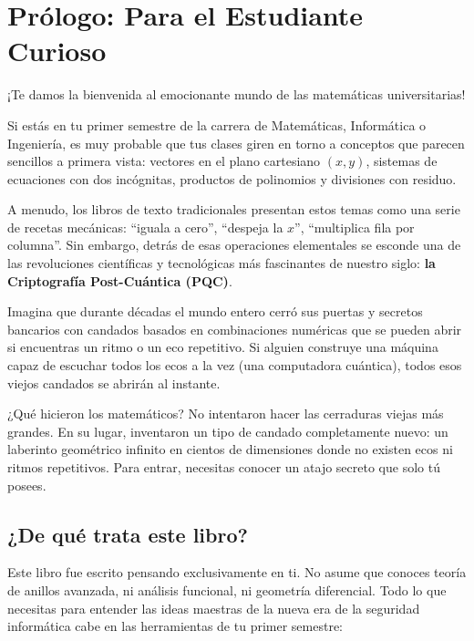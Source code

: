 \chapter*{Prólogo: Para el Estudiante Curioso}

¡Te damos la bienvenida al emocionante mundo de las matemáticas universitarias!

Si estás en tu primer semestre de la carrera de Matemáticas, Informática o Ingeniería, es muy probable que tus clases giren en torno a conceptos que parecen sencillos a primera vista: vectores en el plano cartesiano $(x, y)$, sistemas de ecuaciones con dos incógnitas, productos de polinomios y divisiones con residuo.

A menudo, los libros de texto tradicionales presentan estos temas como una serie de recetas mecánicas: ``iguala a cero'', ``despeja la $x$'', ``multiplica fila por columna''. Sin embargo, detrás de esas operaciones elementales se esconde una de las revoluciones científicas y tecnológicas más fascinantes de nuestro siglo: \textbf{la Criptografía Post-Cuántica (PQC)}.

\begin{metafora}
Imagina que durante décadas el mundo entero cerró sus puertas y secretos bancarios con candados basados en combinaciones numéricas que se pueden abrir si encuentras un ritmo o un eco repetitivo. Si alguien construye una máquina capaz de escuchar todos los ecos a la vez (una computadora cuántica), todos esos viejos candados se abrirán al instante.

¿Qué hicieron los matemáticos? No intentaron hacer las cerraduras viejas más grandes. En su lugar, inventaron un tipo de candado completamente nuevo: un laberinto geométrico infinito en cientos de dimensiones donde no existen ecos ni ritmos repetitivos. Para entrar, necesitas conocer un atajo secreto que solo tú posees.
\end{metafora}

\section*{¿De qué trata este libro?}

Este libro fue escrito pensando exclusivamente en ti. No asume que conoces teoría de anillos avanzada, ni análisis funcional, ni geometría diferencial. Todo lo que necesitas para entender las ideas maestras de la nueva era de la seguridad informática cabe en las herramientas de tu primer semestre:

